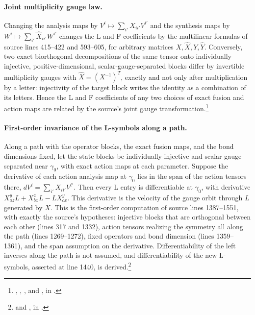 \documentclass{article}
\begin{document}
\paragraph{Joint multiplicity gauge law.}
Changing the analysis maps by $V^i\mapsto\sum_{i'}X_{ii'}V^{i'}$ and the
synthesis maps by $W^i\mapsto\sum_{i'}\hat X_{ii'}W^{i'}$ changes the L and
F coefficients by the multilinear formulas of source lines 415--422 and
593--605, for arbitrary matrices $X,\hat X,Y,\hat Y$. Conversely, two exact
biorthogonal decompositions of the same tensor onto individually injective,
positive-dimensional, scalar-gauge-separated blocks differ by invertible
multiplicity gauges with $\hat X=(X^{-1})^{T}$, exactly and not only after
multiplication by a letter: injectivity of the target block writes the
identity as a combination of its letters. Hence the L and F coefficients
of any two choices of exact fusion and action maps are related by the
source's joint gauge transformation.\footnote{
    ,
    ,
    ,
    and
    , in
    .}

\paragraph{First-order invariance of the L-symbols along a path.}
Along a path with the operator blocks, the exact fusion maps, and the bond
dimensions fixed, let the state blocks be individually injective and
scalar-gauge-separated near $\gamma_0$, with exact action maps at each
parameter. Suppose the derivative of each action analysis map at $\gamma_0$
lies in the span of the action tensors there,
$dV^i=\sum_{i'}X_{ii'}V^{i'}$. Then every L entry is differentiable at
$\gamma_0$, with derivative $X_{az}^yL+X_{bx}^zL-LX_{cx}^y$. This
derivative is the velocity of the gauge orbit through $L$ generated by $X$.
This is the first-order computation of source lines 1387--1551, with
exactly the source's hypotheses: injective blocks that are orthogonal
between each other (lines 317 and 1332), action tensors realizing the
symmetry all along the path (lines 1269--1272), fixed operators and bond
dimension (lines 1359--1361), and the span assumption on the derivative.
Differentiability of the left inverses along the path is not assumed, and
differentiability of the new L-symbols, asserted at line 1440, is
derived.\footnote{
     and
    , in
    .}
\end{document}
